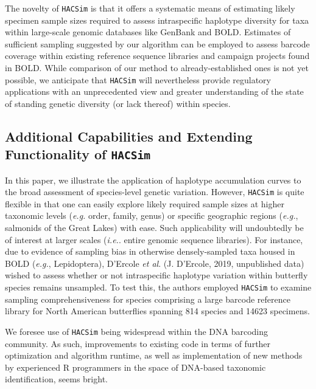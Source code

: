 The novelty of {\tt HACSim} is that it offers a systematic means of estimating likely \\ specimen sample sizes required to assess intraspecific haplotype diversity for taxa within large-scale genomic databases like GenBank and BOLD. Estimates of sufficient sampling suggested by our algorithm can be employed to assess barcode coverage within existing reference sequence libraries and campaign projects found in BOLD. While comparison of our method to already-established ones is not yet possible, we anticipate that {\tt HACSim} will nevertheless provide regulatory applications with an unprecedented view and greater understanding of the state of standing genetic diversity (or lack thereof) within species.    


\subsection{Additional Capabilities and Extending Functionality of \tt{HACSim}}

In this paper, we illustrate the application of haplotype accumulation curves to the broad assessment of species-level genetic variation. However, {\tt HACSim} is quite flexible in that one can easily explore likely required sample sizes at higher taxonomic levels (\textit{e.g.} order, family, genus) or specific geographic regions (\textit{e.g.}, salmonids of the Great Lakes) with ease. Such applicability will undoubtedly be of interest at larger scales (\textit{i.e.}. entire genomic sequence libraries). For instance, due to evidence of sampling bias in otherwise densely-sampled taxa housed in BOLD (\textit{e.g.}, Lepidoptera), D'Ercole \textit{et al}. (J. D'Ercole, 2019, unpublished data) wished to assess whether or not intraspecific haplotype variation within butterfly species remains unsampled. To test this, the authors employed {\tt HACSim} to examine sampling comprehensiveness for species comprising a large barcode reference library for North American butterflies spanning 814 species and 14623 specimens.

We foresee use of {\tt HACSim} being widespread within the DNA barcoding community. As such, improvements to existing code in terms of further optimization and algorithm runtime, as well as implementation of new methods by experienced R programmers in the space of DNA-based taxonomic identification, seems bright.


